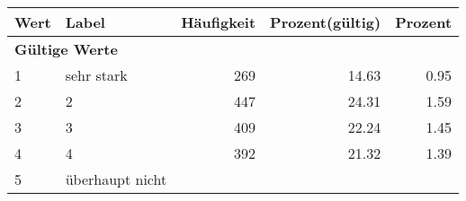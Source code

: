      \begin{longtable}{lXrrr}
     \toprule
     \textbf{Wert} & \textbf{Label} & \textbf{Häufigkeit} & \textbf{Prozent(gültig)} & \textbf{Prozent} \\
     \endhead
     \midrule
     \multicolumn{5}{l}{\textbf{Gültige Werte}}\\

     1 &
     \multicolumn{1}{X}{ sehr stark   } &


       \num{269} &
       \num[round-mode=places,round-precision=2]{14.63} &
         \num[round-mode=places,round-precision=2]{0.95} \\

     2 &
     \multicolumn{1}{X}{ 2   } &


       \num{447} &
       \num[round-mode=places,round-precision=2]{24.31} &
         \num[round-mode=places,round-precision=2]{1.59} \\

     3 &
     \multicolumn{1}{X}{ 3   } &


       \num{409} &
       \num[round-mode=places,round-precision=2]{22.24} &
         \num[round-mode=places,round-precision=2]{1.45} \\

     4 &
     \multicolumn{1}{X}{ 4   } &


       \num{392} &
       \num[round-mode=places,round-precision=2]{21.32} &
         \num[round-mode=places,round-precision=2]{1.39} \\

     5 &
     \multicolumn{1}{X}{ überhaupt nicht   } &



\end{longtable}
